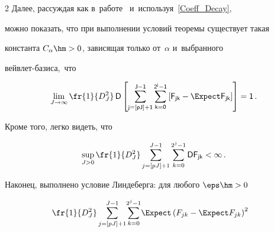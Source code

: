 \begin{multicols}{2}
Далее, рассуждая как в~работе~\cite{ESH14} и~используя~\eqref{Coeff_Decay}, 

мож\-но показать, что при выполнении условий тео\-ре\-мы существует такая 

константа $C_\alpha\hm>0$, за\-ви\-ся\-щая только от~$\alpha$ и~вы\-бран\-но\-го 

вейв\-лет-ба\-зи\-са,~что



\vspace*{4pt}



\noindent

\begin{equation*}


\lim\limits_{J\to\infty} \fr{1}{D^2_J}\,\Variance\left[

\sum\limits_{j=[pJ]+1}^{J-1}\sum\limits_{k=0}^{2^j-1}   

\left[F_{jk}-\Expect F_{jk}\right]\right] =1\,.

\end{equation*}

Кроме того, легко видеть, что



\vspace*{2pt}



\noindent

\begin{equation*}

\sup_{J>0} \fr{1}{D^2_J}\sum\limits_{j=[pJ]+1}^{J-1}\sum\limits_{k=0}^{2^j-1} 

\Variance  F_{jk} < \infty\,.

\end{equation*}



 Наконец, выполнено условие Линдеберга: для любого $\eps\hm>0$

 

\columnbreak

 

 \noindent

\begin{multline}

\label{Norm_Cond}

\hspace*{-3mm}\fr{1}{D^2_J}\sum\limits_{j=[pJ]+1}^{J-1}\!\sum\limits_{k=0}^{2^j-1} \!\Expect  

\left( F_{jk} - \Expect F_{jk}\right)^2


\end{multline}
\end{multicols}

